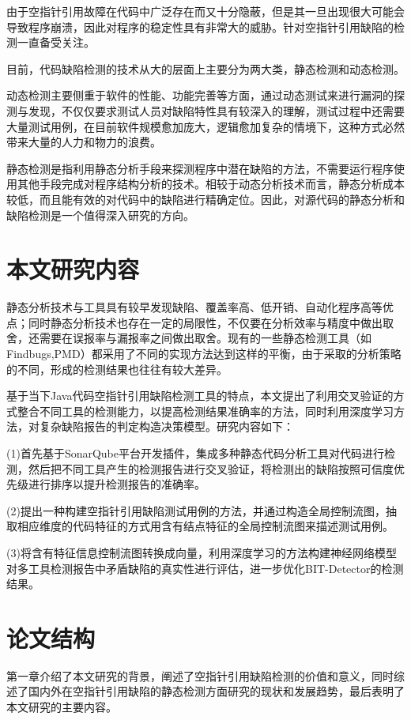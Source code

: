 由于空指针引用故障在代码中广泛存在而又十分隐蔽，但是其一旦出现很大可能会导致程序崩溃，因此对程序的稳定性具有非常大的威胁。针对空指针引用缺陷的检测一直备受关注。

目前，代码缺陷检测的技术从大的层面上主要分为两大类，静态检测和动态检测。

动态检测\cite{wei2009safety}主要侧重于软件的性能、功能完善等方面，通过动态测试来进行漏洞的探测与发现，不仅仅要求测试人员对缺陷特性具有较深入的理解，测试过程中还需要大量测试用例，在目前软件规模愈加庞大，逻辑愈加复杂的情境下，这种方式必然带来大量的人力和物力的浪费。

静态检测\cite{lin2008static}是指利用静态分析手段来探测程序中潜在缺陷的方法，不需要运行程序使用其他手段完成对程序结构分析的技术。相较于动态分析技术而言，静态分析成本较低，而且能有效的对代码中的缺陷进行精确定位。因此，对源代码的静态分析和缺陷检测是一个值得深入研究的方向。


\section{本文研究内容}
静态分析技术与工具具有较早发现缺陷、覆盖率高、低开销、自动化程序高等优点；同时静态分析技术也存在一定的局限性，不仅要在分析效率与精度中做出取舍，还需要在误报率与漏报率之间做出取舍。现有的一些静态检测工具（如Findbugs,PMD）都采用了不同的实现方法达到这样的平衡，由于采取的分析策略的不同，形成的检测结果也往往有较大差异。

基于当下Java代码空指针引用缺陷检测工具的特点，本文提出了利用交叉验证的方式整合不同工具的检测能力，以提高检测结果准确率的方法，同时利用深度学习方法，对复杂缺陷报告的判定构造决策模型。研究内容如下：

(1)首先基于SonarQube平台开发插件，集成多种静态代码分析工具对代码进行检测，然后把不同工具产生的检测报告进行交叉验证，将检测出的缺陷按照可信度优先级进行排序以提升检测报告的准确率。

(2)提出一种构建空指针引用缺陷测试用例的方法，并通过构造全局控制流图，抽取相应维度的代码特征的方式用含有结点特征的全局控制流图来描述测试用例。

(3)将含有特征信息控制流图转换成向量，利用深度学习的方法构建神经网络模型对多工具检测报告中矛盾缺陷的真实性进行评估，进一步优化BIT-Detector的检测结果。

\section{论文结构}
第一章介绍了本文研究的背景，阐述了空指针引用缺陷检测的价值和意义，同时综述了国内外在空指针引用缺陷的静态检测方面研究的现状和发展趋势，最后表明了本文研究的主要内容。

